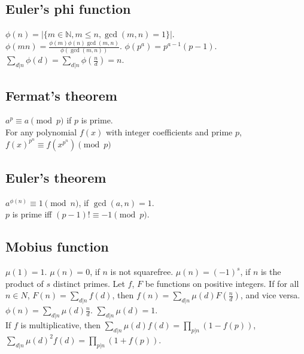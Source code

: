 \documentclass[12pt]{extarticle}
\begin{document}
\begin{multicols*}{2}
\subsection{Euler's phi function}
$\phi(n)=|\{m \in {\mathbb N}, m \le n, \gcd(m, n) = 1 \}|$. \\

$\phi(mn) = \frac{\phi(m) \phi(n) \gcd(m,n)}{\phi(\gcd(m,n))}$. \quad
$\phi(p^a) = p^{a-1} (p-1)$. \quad \\

$\sum_{d|n} \phi(d) = \sum_{d|n} \phi(\frac{n}{d}) = n$.

\subsection{Fermat's theorem}  $a^p \equiv a \pmod{p}$ if $p$ is prime. \\
For any polynomial $f(x)$ with integer coefficients and prime $p$,
$f(x)^{p^n} \equiv f(x^{p^n}) \pmod{p}$
\subsection{Euler's theorem} $a^{\phi(n)} \equiv 1\pmod{n}$, if $\gcd(a,n)=1$. \\ $p$ is prime iff $(p - 1)! \equiv -1 \pmod p$.

\subsection{Mobius function}
$\mu(1) = 1$. $\mu(n) = 0$, if $n$ is not squarefree.
$\mu(n) = (-1)^s$, if $n$ is the product of $s$ distinct primes.
Let $f$, $F$ be functions on positive integers.
If for all $n \in N$, $F(n)=\sum_{d|n} f(d)$, then $f(n) = \sum_{d|n} \mu(d) F(\frac{n}{d})$,
and vice versa. \quad
$\phi(n) = \sum_{d|n} \mu(d) \frac{n}{d}$.
\quad $\sum_{d|n} \mu(d) = 1$. \\
If $f$ is multiplicative, then $\sum_{d|n} \mu(d) f(d) = \prod_{p|n}(1-f(p))$,
$\sum_{d|n} \mu(d)^2 f(d) = \prod_{p|n} (1+f(p))$.



\end{multicols*}
\end{document}
